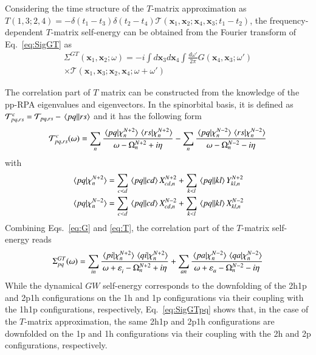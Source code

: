 \documentclass[aip,jcp,reprint,noshowkeys,superscriptaddress]{revtex4-1}
\newcommand{\bx}{\mathbf{x}}
\newcommand{\e}[2]{\eps_{#1}^{#2}}
\newcommand{\Om}[2]{\Omega_{#1}^{#2}}
\newcommand{\eps}{\varepsilon}
\newcommand{\cT}{\mathcal{T}}
\begin{document}
Considering the time structure of the $T$-matrix approximation as $T(1,3;2,4)=-\delta(t_1-t_3)\delta(t_2-t_4)\cT(\bx_1,\bx_2;\bx_4,\bx_3;t_1-t_2)$, \cite{Martin_2016} the  frequency-dependent $T$-matrix self-energy can be obtained from the Fourier transform of Eq.~\eqref{eq:SigGT} as 
\begin{multline}
    \Sigma^{GT}(\bx_1,\bx_2;\omega) 
    = -i \int d\bx_3 d\bx_4 \int\frac{d\omega'}{2\pi} G(\bx_4,\bx_3;\omega') \\
    \times \cT(\bx_1,\bx_3;\bx_2,\bx_4;\omega+\omega')
\end{multline}

The correlation part of $T$ matrix can be constructed from the knowledge of the pp-RPA eigenvalues and eigenvectors. 
In the spinorbital basis, it is defined as $\cT^c_{pq,rs}=\cT_{pq,rs}-\mel{pq}{}{rs}$ and it has the following form \cite{Zhang_2016}
\begin{equation}
\label{eq:T}
	\cT^c_{pq,rs}(\omega) 
		= \sum_{n} \frac{\braket*{pq}{\chi_n^{N+2}}\braket*{rs}{\chi_n^{N+2}}}{\omega - \Om{n}{N+2} + i\eta}
		- \sum_{n} \frac{\braket*{pq}{\chi_n^{N-2}}\braket*{rs}{\chi_n^{N-2}}}{\omega - \Om{n}{N-2} - i\eta}
\end{equation}
with
\begin{subequations}
\begin{align}
	\braket*{pq}{\chi_n^{N+2}} & = \sum_{c < d} \mel{pq}{}{cd} X_{cd,n}^{N+2} + \sum_{k < l}  \mel{pq}{}{kl} Y_{kl,n}^{N+2}
	\\
	\braket*{pq}{\chi_n^{N-2}} & = \sum_{c < d} \mel{pq}{}{cd} X_{cd,n}^{N-2} + \sum_{k < l}  \mel{pq}{}{kl} X_{kl,n}^{N-2}
\end{align}
\end{subequations}
Combining Eqs.~\eqref{eq:G} and \eqref{eq:T}, the correlation part of the $T$-matrix self-energy reads \cite{Romaniello_2012,Martin_2016,Zhang_2017,Li_2021b}
\begin{equation}
\label{eq:SigGTpq}
	\Sigma^{GT}_{pq}(\omega)
	= \sum_{in} \frac{\braket*{pi}{\chi_n^{N+2}}\braket*{qi}{\chi_n^{N+2}}}{\omega + \e{i}{} - \Om{n}{N+2} + i\eta}
	+ \sum_{an} \frac{\braket*{pa}{\chi_n^{N-2}}\braket*{qa}{\chi_n^{N-2}}}{\omega + \e{a}{} - \Om{n}{N-2} - i\eta}
\end{equation}
While the dynamical $GW$ self-energy corresponds to the downfolding of the 2h1p and 2p1h configurations on the 1h and 1p configurations via their coupling with the 1h1p configurations, respectively, \cite{Bintrim_2021a} Eq.~\eqref{eq:SigGTpq} shows that, in the case of the $T$-matrix approximation, the same 2h1p and 2p1h configurations are downfolded on the 1p and 1h configurations via their coupling with the 2h and 2p configurations, respectively.
\end{document}
